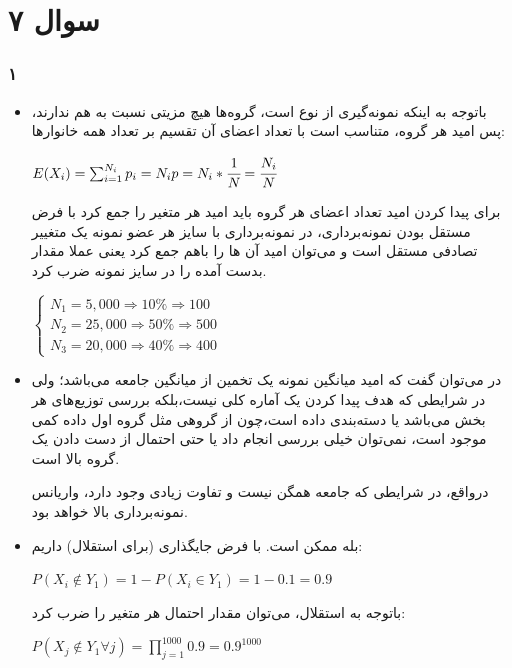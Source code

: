 \documentclass[12pt]{article}
\begin{document}
	\section{سوال ۷}
	\subsubsection{۱}
	\begin{itemize}
		\item 
	باتوجه به اینکه نمونه‌گیری از نوع 
	است، گروه‌ها هیچ مزیتی نسبت به هم ندارند، پس امید هر گروه، متناسب است با تعداد اعضای آن تقسیم بر تعداد همه خانوارها:
		\begin{latin}
		$
		E(X_i) = \sum_{i = 1}^{N_i} p_i = N_i  p = N_i * \cfrac{1}{N} = \cfrac{N_i}{N}
		$
	\end{latin}
	برای پیدا کردن امید تعداد اعضای هر گروه باید امید هر متغیر را جمع کرد با فرض مستقل بودن نمونه‌برداری،‌ در نمونه‌برداری با سایز 
	هر عضو نمونه یک متغییر تصادفی مستقل است و می‌توان امید آن ها را باهم جمع کرد یعنی عملا مقدار بدست آمده را در سایز نمونه ضرب کرد.
	\begin{latin}
		$ 
		\begin{cases}
			 N_1 = 5,000 \Rightarrow 10\%  \Rightarrow 100 \\
			N_2 = 25,000 \Rightarrow 50\% \Rightarrow 500 \\
			N_3 = 20,000 \Rightarrow 40\% \Rightarrow 400 
		\end{cases}
		$
	\end{latin}

		\item 
		در 
		می‌توان گفت که امید میانگین نمونه یک تخمین 
		از میانگین جامعه می‌باشد؛ ولی در شرایطی که هدف پیدا کردن یک آماره کلی نیست،‌بلکه بررسی توزیع‌های هر بخش می‌باشد یا دسته‌بندی داده است،‌چون از گروهی مثل گروه اول داده کمی موجود است،‌ نمی‌توان خیلی بررسی انجام داد یا حتی احتمال از دست دادن یک گروه بالا است. 
		
		درواقع، در شرایطی که جامعه همگن نیست و تفاوت زیادی وجود دارد، واریانس نمونه‌برداری 
		بالا خواهد بود.
\item 
بله ممکن است. با فرض جایگذاری (برای استقلال) داریم:
\begin{latin}
	$
	P(X_i \notin Y_1) = 1 - P(X_i \in Y_1) = 1 - 0.1 = 0.9 
	$
\end{latin}
باتوجه به استقلال، می‌توان مقدار احتمال هر متغیر را ضرب کرد:
\begin{latin}
	$
	P(X_j \notin Y_1 \forall j) = \prod\limits_{j=1}^{1000} 0.9 = 0.9^{1000}
	$
\end{latin}
	\end{itemize}
\end{document}
